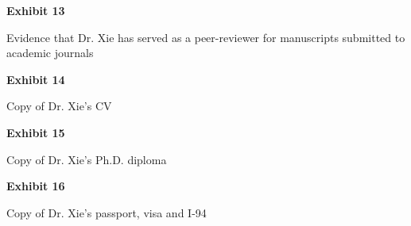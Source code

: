 \documentclass{article}
\begin{document}




\vspace*{\fill}

\begin{center}

{\LARGE \bf
Exhibit 13
}

\vspace{10\baselineskip}

{\large Evidence that Dr. Xie has served as a peer-reviewer for manuscripts submitted to academic journals}

\end{center}
\vspace*{\fill}





\vspace*{\fill}

\begin{center}

{\LARGE \bf
Exhibit 14
}

\vspace{10\baselineskip}

{\large Copy of Dr. Xie’s CV}

\end{center}
\vspace*{\fill}



\vspace*{\fill}

\begin{center}

{\LARGE \bf
Exhibit 15
}

\vspace{10\baselineskip}

{\large Copy of Dr. Xie’s Ph.D. diploma}

\end{center}
\vspace*{\fill}



\vspace*{\fill}

\begin{center}

{\LARGE \bf
Exhibit 16
}

\vspace{10\baselineskip}

{\large Copy of Dr. Xie’s passport, visa and I-94}

\end{center}
\vspace*{\fill}
\end{document}
